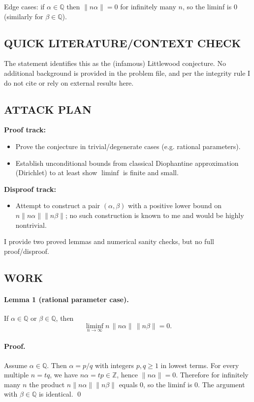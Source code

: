 Edge cases: if $\alpha\in\mathbb{Q}$ then $\|n\alpha\|=0$ for infinitely many $n$, so the liminf is $0$ (similarly for $\beta\in\mathbb{Q}$).

\subsection*{QUICK LITERATURE/CONTEXT CHECK}
The statement identifies this as the (infamous) Littlewood conjecture. No additional background is provided in the problem file, and per the integrity rule I do not cite or rely on external results here.

\subsection*{ATTACK PLAN}
\textbf{Proof track:}
\begin{itemize}
\item Prove the conjecture in trivial/degenerate cases (e.g. rational parameters).
\item Establish unconditional bounds from classical Diophantine approximation (Dirichlet) to at least show $\liminf$ is finite and small.
\end{itemize}
\textbf{Disproof track:}
\begin{itemize}
\item Attempt to construct a pair $(\alpha,\beta)$ with a positive lower bound on $n\|n\alpha\|\|n\beta\|$; no such construction is known to me and would be highly nontrivial.
\end{itemize}
I provide two proved lemmas and numerical sanity checks, but no full proof/disproof.

\subsection*{WORK}
\paragraph{Lemma 1 (rational parameter case).}
If $\alpha\in\mathbb{Q}$ or $\beta\in\mathbb{Q}$, then
\[\liminf_{n\to\infty} n\,\|n\alpha\|\,\|n\beta\| = 0.
\]

\paragraph{Proof.}
Assume $\alpha\in\mathbb{Q}$. Then $\alpha=p/q$ with integers $p,q\ge 1$ in lowest terms.
For every multiple $n=tq$, we have $n\alpha=tp\in\mathbb{Z}$, hence $\|n\alpha\|=0$.
Therefore for infinitely many $n$ the product $n\|n\alpha\|\|n\beta\|$ equals $0$, so the liminf is $0$.
The argument with $\beta\in\mathbb{Q}$ is identical.
\qed

